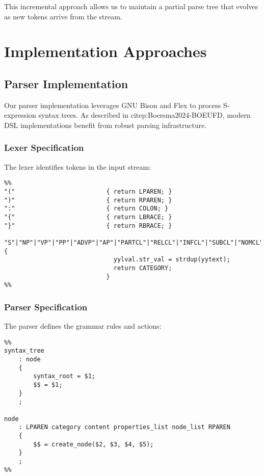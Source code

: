 \documentclass[a4paper,11pt]{article}
\begin{document}
This incremental approach allows us to maintain a partial parse tree that evolves as new tokens arrive from the stream.
\section{Implementation Approaches}
\label{sec:orge0d26c9}

\subsection{Parser Implementation}
\label{sec:orgec44bcf}

Our parser implementation leverages GNU Bison and Flex to process S-expression syntax trees. As described in citep:Boersma2024-BOEUFD, modern DSL implementations benefit from robust parsing infrastructure.
\subsubsection{Lexer Specification}
\label{sec:orgc69e8d6}

The lexer identifies tokens in the input stream:

\begin{verbatim}
%%
"("                         { return LPAREN; }
")"                         { return RPAREN; }
":"                         { return COLON; }
"{"                         { return LBRACE; }
"}"                         { return RBRACE; }

"S"|"NP"|"VP"|"PP"|"ADVP"|"AP"|"PARTCL"|"RELCL"|"INFCL"|"SUBCL"|"NOMCL"|"V"|"N"|"DET"|"PRON"|"ADJ"|"ADV"|"P"|"CONJ"|"SUB"|"REL"|"PART"|"NUM"|"PUNCT"|"AUX" {
                              yylval.str_val = strdup(yytext);
                              return CATEGORY;
                            }
%%
\end{verbatim}
\subsubsection{Parser Specification}
\label{sec:org208b008}

The parser defines the grammar rules and actions:

\begin{verbatim}
%%
syntax_tree
    : node
    { 
        syntax_root = $1;
        $$ = $1;
    }
    ;

node
    : LPAREN category content properties_list node_list RPAREN
    {
        $$ = create_node($2, $3, $4, $5);
    }
    ;
%%
\end{verbatim}
\end{document}
